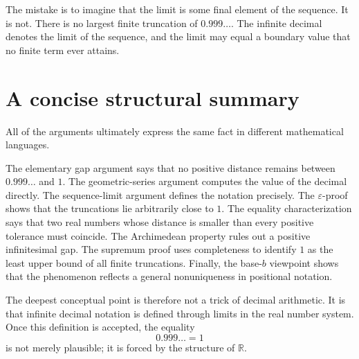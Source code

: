 \documentclass{essay}
\begin{document}
The mistake is to imagine that the limit is some final element of the sequence. It is not. There is no largest finite truncation of \(0.999\ldots\). The infinite decimal denotes the limit of the sequence, and the limit may equal a boundary value that no finite term ever attains.

\section{A concise structural summary}

All of the arguments ultimately express the same fact in different mathematical languages.

The elementary gap argument says that no positive distance remains between \(0.999\ldots\) and \(1\). The geometric-series argument computes the value of the decimal directly. The sequence-limit argument defines the notation precisely. The \(\varepsilon\)-proof shows that the truncations lie arbitrarily close to \(1\). The equality characterization says that two real numbers whose distance is smaller than every positive tolerance must coincide. The Archimedean property rules out a positive infinitesimal gap. The supremum proof uses completeness to identify \(1\) as the least upper bound of all finite truncations. Finally, the base-\(b\) viewpoint shows that the phenomenon reflects a general nonuniqueness in positional notation.

The deepest conceptual point is therefore not a trick of decimal arithmetic. It is that infinite decimal notation is defined through limits in the real number system. Once this definition is accepted, the equality
\[ \boxed{0.999\ldots=1} \]
is not merely plausible; it is forced by the structure of \(\mathbb{R}\).
\end{document}
